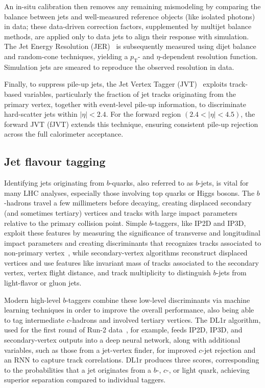 An in-situ calibration then removes any remaining mismodeling by comparing the balance between jets and well-measured reference objects (like isolated photons) in data; these data-driven correction factors, supplemented by multijet balance methods, are applied only to data jets to align their response with simulation. The Jet Energy Resolution (JER)~\cite{Aaboud_2017} is subsequently measured using dijet balance and random-cone techniques, yielding a $p_{\text{T}}$- and $\eta$-dependent resolution function. Simulation jets are smeared to reproduce the observed resolution in data.

Finally, to suppress pile-up jets, the Jet Vertex Tagger (JVT)~\cite{ATL-PHYS-PUB-2014-001} exploits track-based variables, particularly the fraction of jet tracks originating from the primary vertex, together with event-level pile-up information, to discriminate hard-scatter jets within $|\eta|<2.4$. For the forward region $(2.4<|\eta|<4.5)$, the forward JVT (fJVT) extends this technique, ensuring consistent pile-up rejection across the full calorimeter acceptance. 

\subsection*{Jet flavour tagging} 

Identifying jets originating from $b$-quarks, also referred to as $b$-jets, is vital for many LHC analyses, especially those involving top quarks or Higgs bosons. The $b$-hadrons travel a few millimeters before decaying, creating displaced secondary (and sometimes tertiary) vertices and tracks with large impact parameters relative to the primary collision point.
Simple $b$-taggers, like IP2D and IP3D, exploit these features by measuring the significance of transverse and longitudinal impact parameters and creating discriminants that recognizes tracks associated to non-primary vertex~\cite{btag_1,btag_2}, while secondary-vertex algorithms reconstruct displaced vertices and use features like invariant mass of tracks associated to the secondary vertex, vertex flight distance, and track multiplicity to distinguish $b$-jets from light-flavor or gluon jets.

Modern high-level $b$-taggers combine these low-level discriminants via machine learning techniques in order to improve the overall performance, also being able to tag intermediate $c$-hadrons and involved tertiary vertices. The DL1r algorithm, used for the first round of Run-2 data~\cite{tagging}, for example, feeds IP2D, IP3D, and secondary-vertex outputs into a deep neural network, along with additional variables, such as those from a jet-vertex finder, for improved $c$-jet rejection and an RNN to capture track correlations. DL1r produces three scores, corresponding to the probabilities that a jet originates from a $b$-, $c$-, or light quark, achieving superior separation compared to individual taggers.

